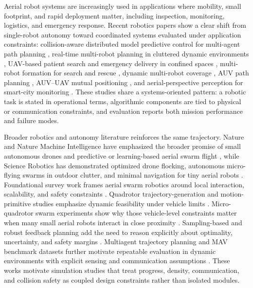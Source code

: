 \documentclass[11pt]{article}
\begin{document}
Aerial robot systems are increasingly used in applications where mobility, small footprint, and rapid deployment matter, including inspection, monitoring, logistics, and emergency response. Recent robotics papers show a clear shift from single-robot autonomy toward coordinated systems evaluated under application constraints: collision-aware distributed model predictive control for multi-agent path planning \cite{mun2026collision}, real-time multi-robot planning in cluttered dynamic environments \cite{zeng2026spfempc}, UAV-based patient search and emergency delivery in confined spaces \cite{zhu2026patient}, multi-robot formation for search and rescue \cite{chang2026pomdp}, dynamic multi-robot coverage \cite{sharma2026coverage}, AUV path planning \cite{chen2026auv}, AUV--UAV mutual positioning \cite{matsuda2026auv}, and aerial-perspective perception for smart-city monitoring \cite{ahmed2026aerial}. These studies share a systems-oriented pattern: a robotic task is stated in operational terms, algorithmic components are tied to physical or communication constraints, and evaluation reports both mission performance and failure modes.

Broader robotics and autonomy literature reinforces the same trajectory. Nature and Nature Machine Intelligence have emphasized the broader promise of small autonomous drones and predictive or learning-based aerial swarm flight \cite{floreano2015future,soria2021predictive,zhang2025differentiable}, while Science Robotics has demonstrated optimized drone flocking, autonomous micro-flying swarms in outdoor clutter, and minimal navigation for tiny aerial robots \cite{vasarhelyi2018optimized,zhou2022swarm,mcguire2019minimal}. Foundational survey work frames aerial swarm robotics around local interaction, scalability, and safety constraints \cite{chung2018survey}. Quadrotor trajectory-generation and motion-primitive studies emphasize dynamic feasibility under vehicle limits \cite{mellinger2012trajectory,mueller2015motionprimitive}. Micro-quadrotor swarm experiments show why those vehicle-level constraints matter when many small aerial robots interact in close proximity \cite{kushleyev2013swarm}. Sampling-based and robust feedback planning add the need to reason explicitly about optimality, uncertainty, and safety margins \cite{karaman2011sampling,majumdar2017funnel}. Multiagent trajectory planning and MAV benchmark datasets further motivate repeatable evaluation in dynamic environments with explicit sensing and communication assumptions \cite{tordesillas2022mader,burri2016euroc}. These works motivate simulation studies that treat progress, density, communication, and collision safety as coupled design constraints rather than isolated modules.
\end{document}

